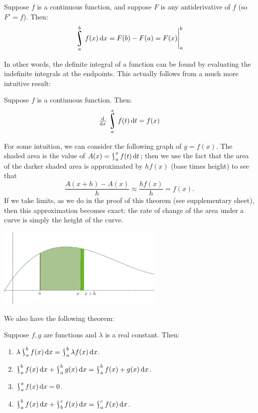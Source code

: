 


\begin{bthm}
  Suppose $ f $ is a continuous function, and suppose $ F $ is any antiderivative of $ f $ (so $ F' = f $). Then:
  \begin{displaymath}
    \rint^b_a f(x) \dif{x} = F(b) - F(a) = \eval{F(x)}_a^b
  \end{displaymath}
\end{bthm}

In other words, the definite integral of a function can be found by evaluating the indefinite integrals at
the endpoints. This actually follows from a much more intuitive result:

\begin{bthm}
  Suppose $ f $ is a continuous function. Then:
  \begin{displaymath}
    \od{}{x} \rint^x_a f(t) \dif{t} = f(x)
  \end{displaymath}
\end{bthm}

For some intuition, we can consider the following graph of $ y = f(x) $. The shaded area is the value of $ A(x) = \rint^x_a f(t) \dif{t} $;
then we use the fact that the area of the darker shaded area is approximated by $ h f(x) $ (base times height) to see that
\begin{displaymath}
  \frac{A(x + h) - A(x)}{h} \approx \frac{h f(x)}{h} = f(x).
\end{displaymath}
If we take limits, as we do in the proof of this theorem (see supplementary sheet), then this approximation becomes exact: the rate of change of
the area under a curve is simply the height of the curve.

\begin{center}
  \includegraphics[width=0.6\textwidth]{ftc1}
\end{center}

We also have the following theorem:
\begin{thm}
  Suppose $ f,g $ are functions and $ \lambda $ is a real constant. Then:
  \begin{enumerate}
    \item $ \lambda \rint_a^b f(x) \dif{x} = \rint_a^b \lambda f(x) \dif{x} $.
    \item $ \rint_a^b f(x) \dif{x} + \rint_a^b g(x) \dif{x} = \rint_a^b f(x) + g(x) \dif{x} $.
    \item $ \rint_a^a f(x) \dif{x} = 0 $.
    \item $ \rint_a^b f(x) \dif{x} + \rint_b^c f(x) \dif{x} = \rint_a^c f(x) \dif{x} $.
  \end{enumerate}
\end{thm}

